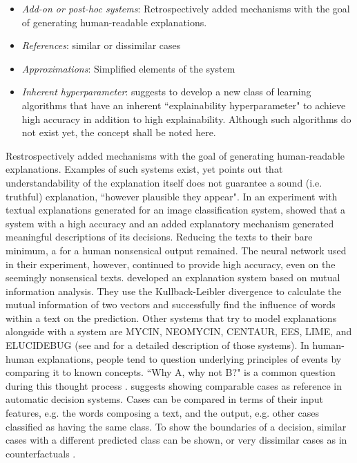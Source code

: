 \begin{itemize}
	\item \textit{Add-on or post-hoc systems}: Retrospectively added mechanisms with the goal of generating human-readable explanations.
	\item \textit{References}: similar or dissimilar cases
	\item \textit{Approximations}: Simplified elements of the system
	\item \textit{Inherent hyperparameter}: \cite{richardson2018survey} suggests to develop a new class of learning algorithms that have an inherent ``explainability hyperparameter" to achieve high accuracy in addition to high explainability. Although such algorithms do not exist yet, the concept shall be noted here.
\end{itemize}
Restrospectively added mechanisms with the goal of generating human-readable explanations. Examples of such systems exist, yet \cite{lipton2016mythos} points out that understandability of the explanation itself does not guarantee a sound (i.e. truthful) explanation, ``however plausible they appear". In an experiment with textual explanations generated for an image classification system, \cite{feng2018pathologies} showed that a system with a high accuracy and an added explanatory mechanism generated meaningful descriptions of its decisions. Reducing the texts to their bare minimum, a for a human nonsensical output remained. The neural network used in their experiment, however, continued to provide high accuracy, even on the seemingly nonsensical texts. \cite{chen2018learning} developed an explanation system based on mutual information analysis. They use the Kullback-Leibler divergence to calculate the mutual information of two vectors and successfully find the influence of words within a text on the prediction. Other systems that try to model explanations alongside with a system are MYCIN, NEOMYCIN, CENTAUR, EES, LIME, and ELUCIDEBUG (see \cite{preece2018asking} and \cite{ribeiro2016should} for a detailed description of those systems).\newline
In human-human explanations, people tend to question underlying principles of events by comparing it to known concepts. ``Why A, why not B?" is a common question during this thought process \cite{miller2017explanation}. \cite{chen2018learning} suggests showing comparable cases as reference in automatic decision systems. Cases can be compared in terms of their input features, e.g. the words composing a text, and the output, e.g. other cases classified as having the same class. To show the boundaries of a decision, similar cases with a different predicted class can be shown, or very dissimilar cases as in counterfactuals \cite{hendricks2018generating}.\newline
